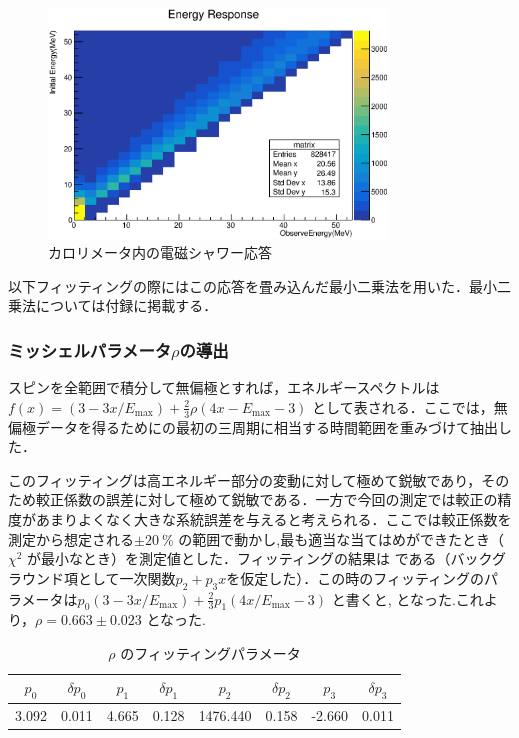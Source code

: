 \begin{figure}[bht]
\centering
\includegraphics[width=0.8\textwidth]{figure/hatano/response.eps}
\caption{カロリメータ内の電磁シャワー応答}
\label{hatano_fig:response}
\end{figure}

以下フィッティングの際にはこの応答を畳み込んだ最小二乗法を用いた．最小二乗法については付録に掲載する．

\subsubsection{ミッシェルパラメータ$\rho$の導出}
スピンを全範囲で積分して無偏極とすれば，エネルギースペクトルは$f(x)=(3 - 3x / E_\mathrm{max})+\frac{2}{3}\rho(4x - E_\mathrm{max} - 3)$ として表される．ここでは，無偏極データを得るためにの最初の三周期に相当する時間範囲を重みづけて抽出した．

このフィッティングは高エネルギー部分の変動に対して極めて鋭敏であり，そのため較正係数の誤差に対して極めて鋭敏である．一方で今回の測定では較正の精度があまりよくなく大きな系統誤差を与えると考えられる．ここでは較正係数を測定から想定される$\pm 20~\%$ の範囲で動かし,最も適当な当てはめができたとき（$\chi^2$ が最小なとき）を測定値とした．フィッティングの結果は である（バックグラウンド項として一次関数$p_2+p_3x$を仮定した）．この時のフィッティングのパラメータは$p_0(3 - 3x / E_\mathrm{max}) + \frac{2}{3} p_{1} (4x / E_\mathrm{max} - 3)$ と書くと, となった.これより，$\rho=0.663 \pm 0.023$ となった.
\begin{table}[bht]
\centering
\caption{$\rho$ のフィッティングパラメータ}
\begin{tabular}{cccccccc}
$p_0$ & $\delta p_0$ & $p_1$ & $\delta p_1$ & $p_2$ & $\delta p_2$ & $p_3$ & $\delta p_3$ \\ \hline
3.092 & 0.011 & 4.665 & 0.128 & 1476.440 & 0.158 & -2.660 & 0.011
\end{tabular}
\label{hatano_tab:rho}
\end{table}

